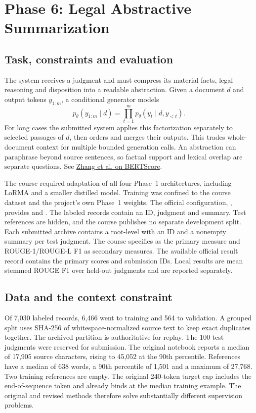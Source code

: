 \clearpage
\section{Phase 6: Legal Abstractive Summarization}
\label{sec:phase6}

\subsection{Task, constraints and evaluation}
The system receives a judgment and must compress its material facts, legal
reasoning and disposition into a readable abstraction. Given a document
\(d\) and output tokens \(y_{1:m}\), a conditional generator models
\[
 p_\theta(y_{1:m}\mid d)=\prod_{t=1}^{m}p_\theta(y_t\mid d,y_{<t}).
\]
For long cases the submitted system applies this factorization separately to
selected passages of \(d\), then orders and merges their outputs. This trades
whole-document context for multiple bounded generation calls. An abstraction
can paraphrase beyond source sentences, so factual support and lexical overlap
are separate questions. See \href{https://arxiv.org/abs/1904.09675}{Zhang et al. on BERTScore}.

The course required adaptation of all four Phase~1 architectures, including
LoRMA and a smaller distilled model. Training was confined to the course
dataset and the project's own Phase~1 weights. The official configuration,
, provides  and .
The labeled records contain an ID, judgment and summary. Test references are
hidden, and the course publishes no separate development split. Each submitted
archive contains a root-level  with an ID and a nonempty
summary per test judgment. The course specifies \BERT{} as the primary measure
and ROUGE-1/ROUGE-L F1 as secondary measures. The available official result
record contains the primary scores and submission IDs. Local results are
mean stemmed ROUGE F1 over held-out judgments and are reported separately.

\subsection{Data and the context constraint}
Of 7,030 labeled records, 6,466 went to training and 564 to validation. A
grouped split uses SHA-256 of whitespace-normalized source text to keep exact
duplicates together. The archived partition is authoritative for replay.
The 100 test judgments were reserved for submission. The original notebook
reports a median of 17,905 source characters, rising to 45,052 at the 90th
percentile. References have a median of 638 words, a 90th percentile of
1,501 and a maximum of 27,768. Two training references are empty.
The original 240-token target cap includes the end-of-sequence token and
already binds at the median training example. The original and revised
methods therefore solve substantially different supervision problems.

